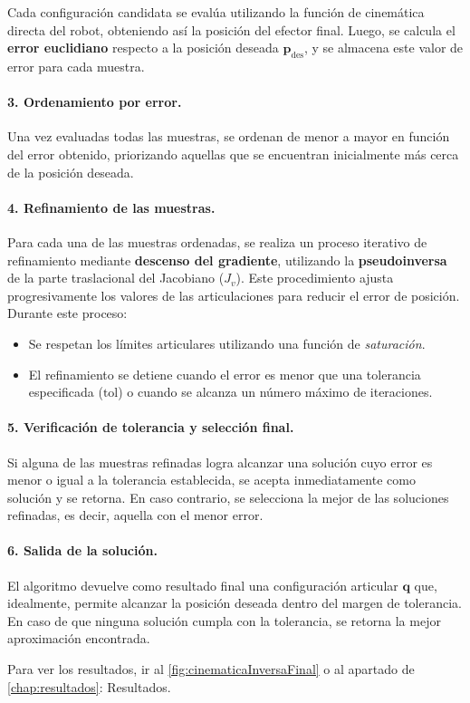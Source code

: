 Cada configuración candidata se evalúa utilizando la función de cinemática directa del robot, obteniendo así la posición del efector final. Luego, se calcula el \textbf{error euclidiano} respecto a la posición deseada $\mathbf{p}_{\text{des}}$, y se almacena este valor de error para cada muestra.

\paragraph{3. Ordenamiento por error.}

Una vez evaluadas todas las muestras, se ordenan de menor a mayor en función del error obtenido, priorizando aquellas que se encuentran inicialmente más cerca de la posición deseada.

\paragraph{4. Refinamiento de las muestras.}

Para cada una de las muestras ordenadas, se realiza un proceso iterativo de refinamiento mediante \textbf{descenso del gradiente}, utilizando la \textbf{pseudoinversa} de la parte traslacional del Jacobiano ($J_v$). Este procedimiento ajusta progresivamente los valores de las articulaciones para reducir el error de posición. Durante este proceso:

\begin{itemize}
	\item Se respetan los límites articulares utilizando una función de \textit{saturación}.
	\item El refinamiento se detiene cuando el error es menor que una tolerancia especificada ($\text{tol}$) o cuando se alcanza un número máximo de iteraciones.
\end{itemize}

\paragraph{5. Verificación de tolerancia y selección final.}

Si alguna de las muestras refinadas logra alcanzar una solución cuyo error es menor o igual a la tolerancia establecida, se acepta inmediatamente como solución y se retorna. En caso contrario, se selecciona la mejor de las soluciones refinadas, es decir, aquella con el menor error.

\paragraph{6. Salida de la solución.}

El algoritmo devuelve como resultado final una configuración articular $\mathbf{q}$ que, idealmente, permite alcanzar la posición deseada dentro del margen de tolerancia. En caso de que ninguna solución cumpla con la tolerancia, se retorna la mejor aproximación encontrada.

Para ver los resultados, ir al \autoref{fig:cinematicaInversaFinal} o al apartado de  \autoref{chap:resultados}: Resultados.